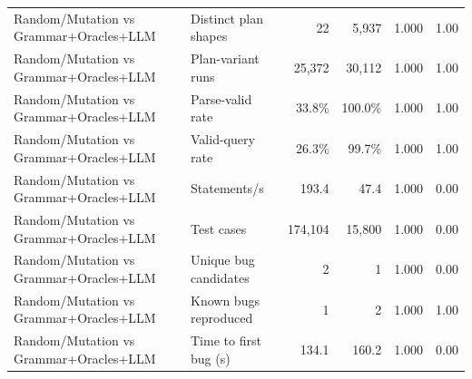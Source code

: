\begin{table}[t]
\begin{tabular}{llrrrr}
    Random/Mutation vs Grammar+Oracles+LLM & Distinct plan shapes & 22 & 5{,}937 & 1.000 & 1.00 \\
    Random/Mutation vs Grammar+Oracles+LLM & Plan-variant runs & 25{,}372 & 30{,}112 & 1.000 & 1.00 \\
    Random/Mutation vs Grammar+Oracles+LLM & Parse-valid rate & 33.8\% & 100.0\% & 1.000 & 1.00 \\
    Random/Mutation vs Grammar+Oracles+LLM & Valid-query rate & 26.3\% & 99.7\% & 1.000 & 1.00 \\
    Random/Mutation vs Grammar+Oracles+LLM & Statements/s & 193.4 & 47.4 & 1.000 & 0.00 \\
    Random/Mutation vs Grammar+Oracles+LLM & Test cases & 174{,}104 & 15{,}800 & 1.000 & 0.00 \\
    Random/Mutation vs Grammar+Oracles+LLM & Unique bug candidates & 2 & 1 & 1.000 & 0.00 \\
    Random/Mutation vs Grammar+Oracles+LLM & Known bugs reproduced & 1 & 2 & 1.000 & 1.00 \\
    Random/Mutation vs Grammar+Oracles+LLM & Time to first bug (s) & 134.1 & 160.2 & 1.000 & 0.00 \\
    \bottomrule
  \end{tabular}
\end{table}
